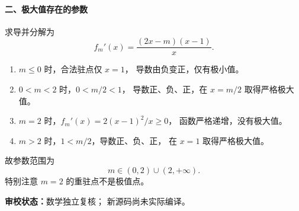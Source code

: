 \documentclass[UTF8,a4paper,11pt]{ctexart}
\begin{document}
\paragraph{二、极大值存在的参数}
求导并分解为
\[
f_m'(x)=\frac{(2x-m)(x-1)}{x}.
\]
\begin{enumerate}
\item $m\le0$ 时，合法驻点仅 $x=1$，
导数由负变正，仅有极小值。
\item $0<m<2$ 时，$0<m/2<1$，
导数正、负、正，在 $x=m/2$ 取得严格极大值。
\item $m=2$ 时，$f_m'(x)=2(x-1)^2/x\ge0$，
函数严格递增，没有极大值。
\item $m>2$ 时，$1<m/2$，导数正、负、正，
在 $x=1$ 取得严格极大值。
\end{enumerate}
故参数范围为
\[
\boxed{m\in(0,2)\cup(2,+\infty)}.
\]
特别注意 $m=2$ 的重驻点不是极值点。

\bigskip
\noindent\textbf{审校状态：}数学独立复核；
新源码尚未实际编译。
\end{document}
